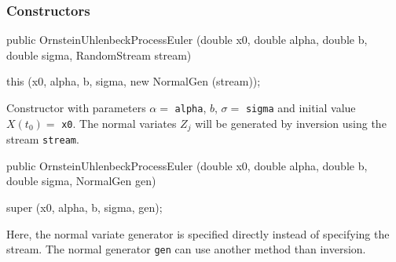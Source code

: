 \subsubsection* {Constructors}
\begin{code}

   public OrnsteinUhlenbeckProcessEuler (double x0, double alpha, double b,
                                         double sigma, RandomStream stream)
   \begin{hide} {
      this (x0, alpha, b, sigma, new NormalGen (stream));
   }\end{hide}
\end{code}
\begin{tabb} Constructor with 
parameters $\alpha =$ \texttt{alpha}, $b$, $\sigma =$ \texttt{sigma} and initial
value $X(t_{0}) =$ \texttt{x0}. The normal variates $Z_j$ will be 
generated by inversion using the stream \texttt{stream}.
\end{tabb}
\begin{code}

   public OrnsteinUhlenbeckProcessEuler (double x0, double alpha, double b,
                                         double sigma, NormalGen gen) \begin{hide} {
      super (x0, alpha, b, sigma, gen);
   }\end{hide}
\end{code}
\begin{tabb} Here, the normal variate generator is specified directly
instead of specifying the stream.
The normal generator \texttt{gen} can use another method than inversion.
\end{tabb}


